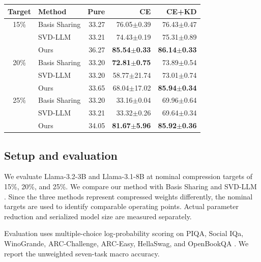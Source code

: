 \documentclass{article}
\begin{document}
\begin{table}[t]
\begin{minipage}[t]{0.485\textwidth}
\begin{tabular}{@{}c l r r r@{}}
\toprule
Target & Method & Pure & CE & CE+KD \\
\midrule
15\%
& Basis Sharing & 33.27 & 76.05$\pm$0.39 & 76.43$\pm$0.47 \\
& SVD-LLM       & 33.21 & 74.43$\pm$0.19 & 75.31$\pm$0.89 \\
& Ours          & 36.27 & \textbf{85.54$\pm$0.33}
                         & \textbf{86.14$\pm$0.33} \\

\addlinespace[1.2pt]

20\%
& Basis Sharing & 33.20 & \textbf{72.81$\pm$0.75} & 73.89$\pm$0.54 \\
& SVD-LLM       & 33.20 & 58.77$\pm$21.74 & 73.01$\pm$0.74 \\
& Ours          & 33.65 & 68.04$\pm$17.02
                         & \textbf{85.94$\pm$0.34} \\

\addlinespace[1.2pt]

25\%
& Basis Sharing & 33.20 & 33.16$\pm$0.04 & 69.96$\pm$0.64 \\
& SVD-LLM       & 33.21 & 33.32$\pm$0.26 & 69.64$\pm$0.34 \\
& Ours          & 34.05 & \textbf{81.67$\pm$5.96}
                         & \textbf{85.92$\pm$0.36} \\
\bottomrule
\end{tabular}
\end{minipage}

\vspace{-0.5mm}
\end{table}
\subsection{Setup and evaluation}

We evaluate Llama-3.2-3B and Llama-3.1-8B
\cite{grattafiori2024llama3} at nominal compression targets of
15\%, 20\%, and 25\%. We compare our method with Basis Sharing
\cite{wang2025basis} and SVD-LLM \cite{wang2025svdllm}. Since the three
methods represent compressed weights differently, the nominal targets are used
to identify comparable operating points. Actual parameter reduction and
serialized model size are measured separately.

Evaluation uses multiple-choice log-probability scoring on PIQA, Social IQa,
WinoGrande, ARC-Challenge, ARC-Easy, HellaSwag, and OpenBookQA
\cite{bisk2020piqa,sap2019socialiqa,sakaguchi2021winogrande,clark2018arc,
zellers2019hellaswag,mihaylov2018openbookqa}. We report the unweighted
seven-task macro accuracy.
\end{document}
